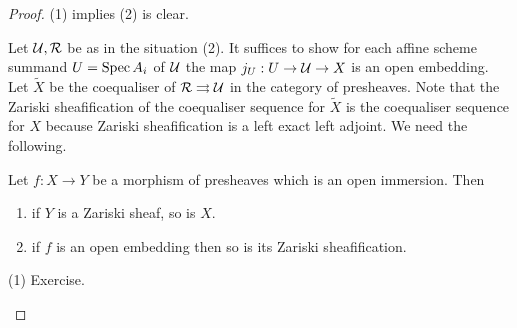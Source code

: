 \documentclass[./main.tex]{subfiles}
\begin{document}
\begin{proof}
  (1) implies (2) is clear.

  Let $\mathcal{U}, \mathcal{R}$ be as in the situation (2).
  It suffices to show for each affine scheme summand $U = \operatorname{Spec} A_i$ of $\mathcal{U}$ 
  the map $j_U : U \to \mathcal{U} \to X$ is an open embedding.
  Let $\tilde{X}$ be the coequaliser of $\mathcal{R} \rightrightarrows \mathcal{U}$
  in the category of presheaves.
  Note that the Zariski sheafification of the coequaliser sequence
  for $\tilde{X}$ is the coequaliser sequence for $X$
  because Zariski sheafification is a left exact left adjoint.
  We need the following.
  \begin{lem}
    Let $f : X \to Y$ be a morphism of presheaves which is an open immersion.
    Then
    \begin{enumerate}
      \item if $Y$ is a Zariski sheaf, so is $X$.
      \item if $f$ is an open embedding then so is its Zariski sheafification.
    \end{enumerate}
    \begin{proof1}
      (1) Exercise.


\end{proof1}
\end{lem}
\end{proof}
\end{document}
